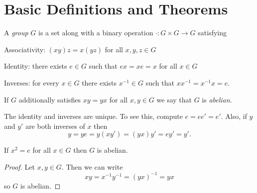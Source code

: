 \section{Basic Definitions and Theorems}

\begin{dfn}
  A \emph{group} $G$ is a set along with a binary operation $\cdot : G \times G \to G$ satisfying
  \begin{myenum}
  \item Associativity: $(xy)z = x(yz)$ for all $x,y,z \in G$
  \item Identity: there exists $e \in G$ such that $e x = x e = x$ for all $x \in G$
  \item Inverses: for every $x \in G$ there exists $x^{-1} \in G$ such that $x x^{-1} = x^{-1} x = e$.
  \end{myenum}
  If $G$ additionally satisfies $xy = yx$ for all $x,y \in G$ we say that $G$ is \emph{abelian}.
\end{dfn}

The identity and inverses are unique. To see this, compute $e = e e' = e'$. Also, if $y$ and $y'$ are both inverses of $x$ then
\[
y = ye = y(xy') = (yx)y' = ey' = y'.
\]

\begin{eg}
  If $x^2 = e$ for all $x \in G$ then $G$ is abelian.
\end{eg}
\begin{proof}
  Let $x, y \in G$. Then we can write
  \[
  xy = x^{-1} y^{-1} = (yx)^{-1} = yx
  \]
  so $G$ is abelian.
\end{proof}
